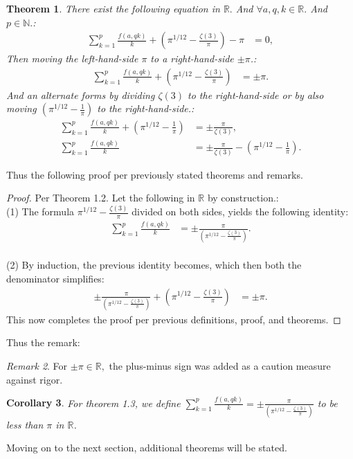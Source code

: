 \documentclass[10pt]{article}
\theoremstyle{plain}
\newtheorem{theorem}{Theorem}[section]
\newtheorem{corollary}[theorem]{Corollary}
\theoremstyle{definition}
\theoremstyle{remark}
\newtheorem{remark}[theorem]{Remark}
\begin{document}
\begin{theorem}
There exist the following equation in $\mathbb{R}.$ And $\forall a, q, k \in \mathbb{R}.$ And $p \in \mathbb{N}.$:
\begin{align*}
	\sum_{k=1}^{p} \frac{f(a, qk)}{k} + (\pi^{1/12} - \frac{\zeta(3)}{\pi}) - \pi &= 0,
\end{align*}
Then moving the left-hand-side $\pi$ to a right-hand-side $\pm \pi$.:
\begin{align*}
	\sum_{k=1}^{p} \frac{f(a, qk)}{k} + (\pi^{1/12} - \frac{\zeta(3)}{\pi}) &= \pm \pi.
\end{align*}
And an alternate forms by dividing $\zeta(3)$ to the right-hand-side or by also moving $(\pi^{1/12} - \frac{1}{\pi})$ to the right-hand-side.:
\begin{align*}
	\sum_{k=1}^{p} \frac{f(a, qk)}{k} + (\pi^{1/12} - \frac{1}{\pi}) &= \pm \frac{\pi}{\zeta(3)},\\
	\sum_{k=1}^{p} \frac{f(a, qk)}{k} &= \pm \frac{\pi}{\zeta(3)} - (\pi^{1/12} - \frac{1}{\pi}) .
\end{align*}
\end{theorem}
Thus the following proof per previously stated theorems and remarks.
\begin{proof}
Per Theorem 1.2. Let the following in $\mathbb{R}$ by construction.:\\(1) The formula $\pi^{1/12} - \frac{\zeta(3)}{\pi}$ divided on both sides, yields the following identity:
\begin{align*}
	\sum_{k=1}^{p} \frac{f(a, qk)}{k}  &= \pm \frac{\pi}{(\pi^{1/12} - \frac{\zeta(3)}{\pi})}.
\end{align*}\\
(2) By induction, the previous identity becomes, which then both the denominator simplifies:
\begin{align*}
	\pm \frac{\pi}{(\pi^{1/12} - \frac{\zeta(3)}{\pi})} + (\pi^{1/12} - \frac{\zeta(3)}{\pi}) &= \pm \pi.
\end{align*}
This now completes the proof per previous definitions, proof, and theorems.
\end{proof}
Thus the remark:
\begin{remark}
For $\pm \pi \in \mathbb{R},$ the plus-minus sign was added as a caution measure against rigor.
\end{remark}
\begin{corollary}
For theorem 1.3, we define $\sum_{k=1}^{p} \frac{f(a, qk)}{k} = \pm \frac{\pi}{(\pi^{1/12} - \frac{\zeta(3)}{\pi})}$ to be less than $\pi$ in $\mathbb{R}$.
\end{corollary} Moving on to the next section, additional theorems will be stated.
\end{document}
